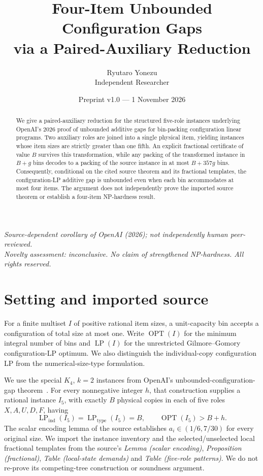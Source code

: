 \documentclass[11pt,a4paper]{article}
\title{\textbf{Four-Item Unbounded Configuration Gaps\\via a Paired-Auxiliary Reduction}}
\author{Ryutaro Yonezu\\\small Independent Researcher}
\date{Preprint v1.0 --- 1 November 2026}
\newcommand{\OPT}{\operatorname{OPT}}
\newcommand{\LP}{\operatorname{LP}}
\begin{document}
\maketitle
\begin{center}
\small\textit{Source-dependent corollary of OpenAI (2026); not independently human peer-reviewed.}\\
\textit{Novelty assessment: inconclusive. No claim of strengthened NP-hardness. All rights reserved.}
\end{center}
\begin{abstract}
We give a paired-auxiliary reduction for the structured five-role instances underlying OpenAI's 2026 proof of unbounded additive gaps for bin-packing configuration linear programs. Two auxiliary roles are joined into a single physical item, yielding instances whose item sizes are strictly greater than one fifth. An explicit fractional certificate of value $B$ survives this transformation, while any packing of the transformed instance in $B+g$ bins decodes to a packing of the source instance in at most $B+357g$ bins. Consequently, conditional on the cited source theorem and its fractional templates, the configuration-LP additive gap is unbounded even when each bin accommodates at most four items. The argument does not independently prove the imported source theorem or establish a four-item NP-hardness result.
\end{abstract}

\section{Setting and imported source}
For a finite multiset $I$ of positive rational item sizes, a unit-capacity bin accepts a configuration of total size at most one. Write $\OPT(I)$ for the minimum integral number of bins and $\LP(I)$ for the unrestricted Gilmore--Gomory configuration-LP optimum. We also distinguish the individual-copy configuration LP from the numerical-size-type formulation.

We use the special $K_4$, $k=2$ instances from OpenAI's unbounded-configuration-gap theorem~\cite{OpenAI2026}. For every nonnegative integer $h$, that construction supplies a rational instance $I_5$, with exactly $B$ physical copies in each of five roles $X,A,U,D,F$, having
\begin{equation}\label{eq:source}
   \LP_{\mathrm{ind}}(I_5)=\LP_{\mathrm{type}}(I_5)=B,
   \qquad \OPT(I_5)>B+h.
\end{equation}
The scalar encoding lemma of the source establishes $a_i\in(1/6,7/30)$ for every original size. We import the instance inventory and the selected/unselected local fractional templates from the source's \emph{Lemma (scalar encoding)}, \emph{Proposition (fractional)}, \emph{Table (local-state demands)} and \emph{Table (five-role patterns)}. We do not re-prove its competing-tree construction or soundness argument.
\end{document}
